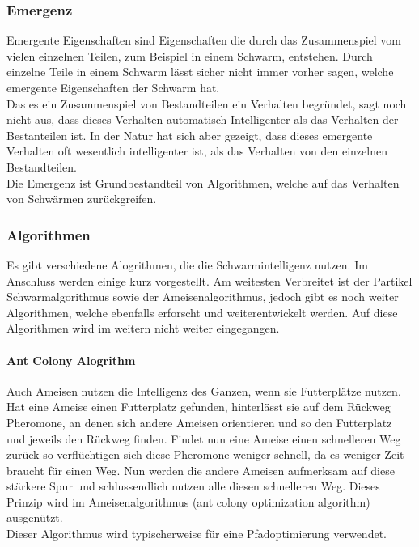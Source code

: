 		\subsubsection{Emergenz}
		Emergente Eigenschaften sind Eigenschaften die durch das Zusammenspiel vom vielen einzelnen Teilen, zum Beispiel in einem Schwarm, entstehen. Durch einzelne Teile in einem Schwarm lässt sicher nicht immer vorher sagen, welche emergente Eigenschaften der Schwarm hat. \\
		Das es ein Zusammenspiel von Bestandteilen ein Verhalten begründet, sagt noch nicht aus, dass dieses Verhalten automatisch Intelligenter als das Verhalten der Bestanteilen ist. In der Natur hat sich aber gezeigt, dass dieses emergente Verhalten oft wesentlich intelligenter ist, als das Verhalten von den einzelnen Bestandteilen. \\
		Die Emergenz ist Grundbestandteil von Algorithmen, welche auf das Verhalten von Schwärmen zurückgreifen.
		\subsubsection{Algorithmen}
		Es gibt verschiedene Alogrithmen, die die Schwarmintelligenz nutzen. Im Anschluss werden einige kurz vorgestellt. Am weitesten Verbreitet ist der Partikel Schwarmalgorithmus sowie der Ameisenalgorithmus, jedoch gibt es noch weiter Algorithmen, welche ebenfalls erforscht und weiterentwickelt werden. Auf diese Algorithmen wird im weitern nicht weiter eingegangen.
		
		\paragraph{Ant Colony Alogrithm}
		$\;$ \\
		Auch Ameisen nutzen die Intelligenz des Ganzen, wenn sie Futterplätze nutzen. Hat eine Ameise einen Futterplatz gefunden, hinterlässt sie auf dem Rückweg Pheromone, an denen sich andere Ameisen orientieren und so den Futterplatz und jeweils den Rückweg finden. Findet nun eine Ameise einen schnelleren Weg zurück so verflüchtigen sich diese Pheromone weniger schnell, da es weniger Zeit braucht für einen Weg. Nun werden die andere Ameisen aufmerksam auf diese stärkere Spur und schlussendlich nutzen alle diesen schnelleren Weg. Dieses Prinzip wird im Ameisenalgorithmus (ant colony optimization algorithm) ausgenützt.\\Dieser Algorithmus wird typischerweise für eine Pfadoptimierung verwendet.
		
